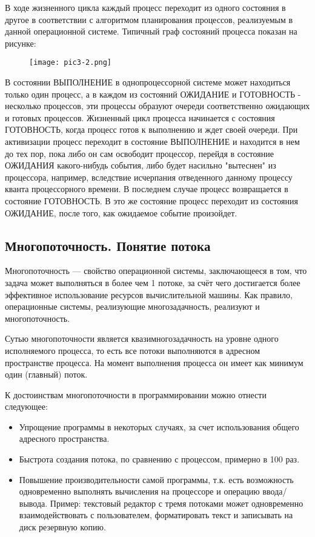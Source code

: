В ходе жизненного цикла каждый процесс переходит из одного состояния в другое в соответствии с алгоритмом планирования процессов, реализуемым в данной операционной системе. Типичный граф состояний процесса показан на рисунке:

\begin{figure}[!h]\center
   \texttt{[image: pic3-2.png]}
\end{figure}

В состоянии ВЫПОЛНЕНИЕ в однопроцессорной системе может находиться только один процесс, а в каждом из состояний ОЖИДАНИЕ и ГОТОВНОСТЬ - несколько процессов, эти процессы образуют очереди соответственно ожидающих и готовых процессов. Жизненный цикл процесса начинается с состояния ГОТОВНОСТЬ, когда процесс готов к выполнению и ждет своей очереди. При активизации процесс переходит в состояние ВЫПОЛНЕНИЕ и находится в нем до тех пор, пока либо он сам освободит процессор, перейдя в состояние ОЖИДАНИЯ какого-нибудь события, либо будет насильно "вытеснен" из процессора, например, вследствие исчерпания отведенного данному процессу кванта процессорного времени. В последнем случае процесс возвращается в состояние ГОТОВНОСТЬ. В это же состояние процесс переходит из состояния ОЖИДАНИЕ, после того, как ожидаемое событие произойдет.
\newpage
\subsection{Многопоточность. Понятие потока}

\begin{opr}
   Многопоточность — свойство операционной системы, заключающееся в том, что задача может выполняться в более чем 1 потоке, за счёт чего достигается более эффективное использование ресурсов вычислительной машины. Как правило, операционные системы, реализующие многозадачность, реализуют и многопоточность.
\end{opr}


Сутью многопоточности является квазимногозадачность на уровне одного исполняемого процесса, то есть все потоки выполняются в адресном пространстве процесса. На момент выполнения процесса он имеет как минимум один (главный) поток.

К достоинствам многопоточности в программировании можно отнести следующее:
\begin{itemize}
   \item Упрощение программы в некоторых случаях, за счет использования общего адресного пространства.
   \item Быстрота создания потока, по сравнению с процессом, примерно в 100 раз.
   \item Повышение производительности самой программы, т.к. есть возможность одновременно выполнять вычисления на процессоре и операцию ввода/вывода. Пример: текстовый редактор с тремя потоками может одновременно взаимодействовать с пользователем, форматировать текст и записывать на диск резервную копию.
\end{itemize}

